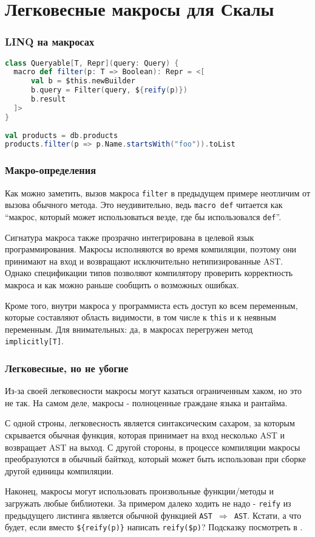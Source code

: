 \documentclass{beamer}
\begin{document}
\section{Легковесные макросы для Скалы}

\begin{frame}[t, fragile]
\frametitle{LINQ на макросах}

\begin{lstlisting}[language=scala]
class Queryable[T, Repr](query: Query) { 
  macro def filter(p: T => Boolean): Repr = <[  
      val b = $this.newBuilder  
      b.query = Filter(query, ${reify(p)})  
      b.result  
  ]> 
} 
 
val products = db.products 
products.filter(p => p.Name.startsWith("foo")).toList 
\end{lstlisting}
\end{frame}

\begin{frame}[t]
\frametitle{Макро-определения}

Как можно заметить, вызов макроса \texttt{filter} в предыдущем примере неотличим от вызова обычного метода. Это неудивительно, ведь \texttt{macro def} читается как ``макрос, который может использоваться везде, где бы использовался \texttt{def}''.

Сигнатура макроса также прозрачно интегрирована в целевой язык программирования. Макросы исполняются во время компиляции, поэтому они принимают на вход и возвращают исключительно нетипизированные AST. Однако спецификации типов позволяют компилятору проверить корректность макроса и как можно раньше сообщить о возможных ошибках.

Кроме того, внутри макроса у программиста есть доступ ко всем переменным, которые составляют область видимости, в том числе к \texttt{this} и к неявным переменным. Для внимательных: да, в макросах перегружен метод \texttt{implicitly[T]}.
\end{frame}

\begin{frame}[t]
\frametitle{Легковесные, но не убогие}

Из-за своей легковесности макросы могут казаться ограниченным хаком, но это не так. На самом деле, макросы - полноценные граждане языка и рантайма.

С одной строны, легковесность является синтаксическим сахаром, за которым скрывается обычная функция, которая принимает на вход несколько AST и возвращает AST на выход. С другой стороны, в процессе компиляции макросы преобразуются в обычный байткод, который может быть использован при сборке другой единицы компиляции.

Наконец, макросы могут использовать произвольные функции/методы и загружать любые библиотеки. За примером далеко ходить не надо - \texttt{reify} из предыдущего листинга является обычной функцией \texttt{AST $\Rightarrow$ AST}. Кстати, а что будет, если вместо \texttt{\$\{reify(p)\}} написать \texttt{reify(\$p)}? Подсказку посмотреть в .
\end{frame}
\end{document}
